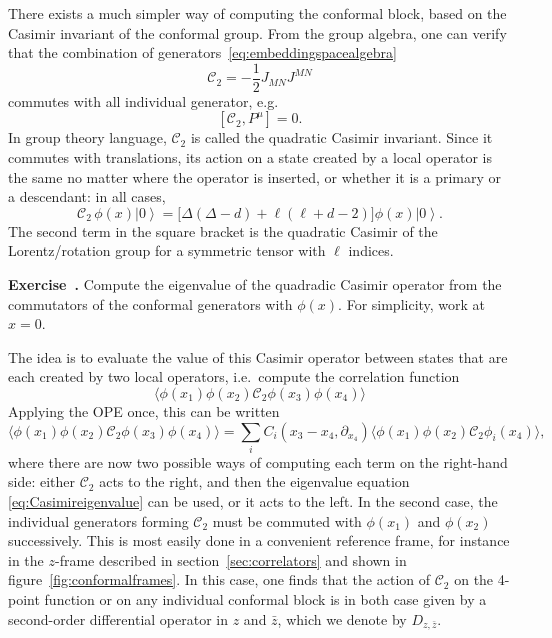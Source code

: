 \documentclass[a4paper,12pt]{article}
\newcommand{\ket}[1]{\left| #1 \right\rangle}
\numberwithin{equation}{section}
\newcounter{exercise}[section]
\newenvironment{exercise}[1][]%
	{\refstepcounter{exercise}\bigskip
	\begin{mdframed}[backgroundcolor=gray!20, linewidth=0]
	\noindent\textbf{Exercise~\thesection.\theexercise #1} \rmfamily}
  	{\end{mdframed}\bigskip}
\begin{document}
There exists a much simpler way of computing the conformal block, based on the Casimir invariant of the conformal group.
From the group algebra, one can verify that the combination of generators~\eqref{eq:embeddingspacealgebra}
\begin{equation}
	\mathcal{C}_2 = -\frac{1}{2} J_{MN} J^{MN}
\end{equation}
commutes with all individual generator, e.g.
\begin{equation}
	\left[ \mathcal{C}_2, P^\mu \right] = 0.
\end{equation}
In group theory language, $\mathcal{C}_2$ is called the quadratic Casimir invariant.
Since it commutes with translations, its action on a state created by a local operator is the same no matter where the operator is inserted, or whether it is a primary or a descendant: in all cases,
\begin{equation}
	\mathcal{C}_2 \, \phi(x) \ket{0}
	= \big[ \Delta (\Delta - d) + \ell (\ell + d - 2) \big]
	\phi(x) \ket{0}.
	\label{eq:Casimireigenvalue}
\end{equation}
The second term in the square bracket is the quadratic Casimir of the Lorentz/rotation group for a symmetric tensor with $\ell$ indices.
%
\begin{exercise}
	Compute the eigenvalue of the quadradic Casimir operator
	from the commutators of the conformal generators with $\phi(x)$.
	For simplicity, work at $x = 0$. 
\end{exercise}
%
The idea is to evaluate the value of this Casimir operator between states that are each created by two local operators, i.e.~compute the correlation function
\begin{equation}
	\langle \phi(x_1) \phi(x_2) \mathcal{C}_2 
	\phi(x_3) \phi(x_4) \rangle
\end{equation}
Applying the OPE once, this can be written
\begin{equation}
	\langle \phi(x_1) \phi(x_2) \mathcal{C}_2 \phi(x_3) \phi(x_4) \rangle
	= \sum_i C_i\left( x_3 - x_4, \partial_{x_4} \right)
	\langle \phi(x_1) \phi(x_2) \mathcal{C}_2 \phi_i(x_4) \rangle,
\end{equation}
where there are now two possible ways of computing each term on the right-hand side: either $\mathcal{C}_2$ acts to the right, and then the eigenvalue equation \eqref{eq:Casimireigenvalue} can be used, or it acts to the left. In the second case, the individual generators forming $\mathcal{C}_2$ must be commuted with $\phi(x_1)$ and $\phi(x_2)$ successively. This is most easily done in a convenient reference frame, for instance in the $z$-frame described in section~\ref{sec:correlators} and shown in figure~\ref{fig:conformalframes}. In this case, one finds that the action of $\mathcal{C}_2$ on the 4-point function or on any individual conformal block is in both case given by a second-order differential operator in $z$ and $\bar{z}$, which we denote by $D_{z, \bar{z}}$. 
\end{document}
